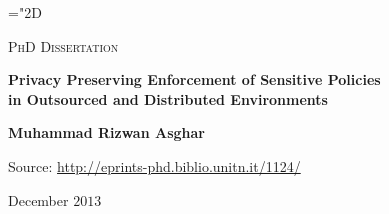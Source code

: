 \documentclass[epsfig,a4paper,11pt,titlepage]{book}
\newcommand{\clearemptydoublepage}{\newpage{\pagestyle{empty}\cleardoublepage}}
\numberwithin{algorithm}{chapter}
\begin{document}
\pagestyle{plain}

\mathchardef\mhyphen="2D

\newpage
\clearemptydoublepage
\thispagestyle{empty}

\begin{center}
\Large \textsc{PhD Dissertation} \\ \tiny
\hrulefill 

\vspace{7cm}

\LARGE\textbf{Privacy Preserving Enforcement of Sensitive Policies \\ in Outsourced and Distributed Environments}

\vspace{1cm}

\Large \textbf{Muhammad Rizwan Asghar} \\

\vspace{4cm}

Source: \url{http://eprints-phd.biblio.unitn.it/1124/}

\vspace{4cm}

\hrulefill

\normalsize
December $2013$

\end{center}
\end{document}
